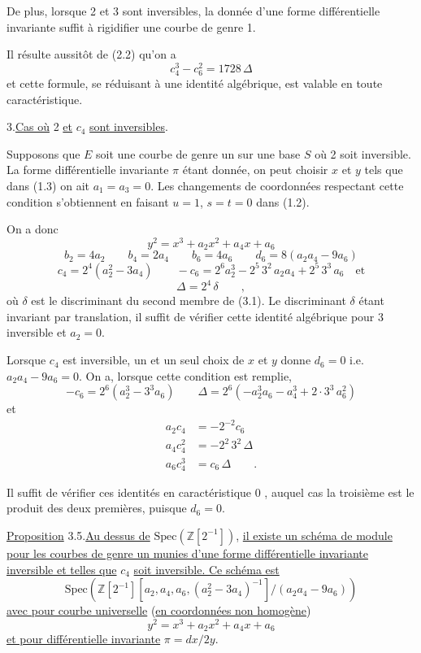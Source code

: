De plus, lorsque 2 et 3 sont inversibles, la donnée d'une forme différentielle invariante suffit à rigidifier une courbe de genre 1.

Il résulte aussitôt de (2.2) qu'on a
\[
c_4^3-c_6^2=1728\,\Delta\tag*{(2.6)}
\]
et cette formule, se réduisant à une identité algébrique, est valable en toute caractéristique.

3.\qquad \uline{Cas où} 2 \uline{et} $c_4$ \uline{sont inversibles}.

Supposons que $E$ soit une courbe de genre un sur une base $S$ où 2 soit inversible. La forme différentielle invariante $\pi$ étant donnée, on peut choisir $x$ et $y$ tels que dans (1.3) on ait $a_1=a_3=0$. Les changements de coordonnées respectant cette condition s'obtiennent en faisant $u=1$, $s=t=0$ dans (1.2).

On a donc
\[
y^2=x^3+a_2x^2+a_4x+a_6\tag*{(3.1)}
\]
\[
b_2=4a_2\qquad b_4=2a_4\qquad b_6=4a_6\qquad d_6=8(a_2a_4-9a_6)
\]
\[
c_4=2^4(a_2^2-3a_4)\qquad -c_6=2^6a_2^3-2^5\,3^2\,a_2a_4+2^5\,3^3\,a_6\quad\text{et}\tag*{(3.2)}
\]
\[
\Delta=2^4\,\delta \qquad ,
\]
où $\delta$ est le discriminant du second membre de (3.1). Le discriminant $\delta$ étant invariant par translation, il suffit de vérifier cette identité algébrique pour 3 inversible et $a_2=0$.

Lorsque $c_4$ est inversible, un et un seul choix de $x$ et $y$ donne $d_6=0$  i.e. $a_2a_4-9a_6=0$. On a, lorsque cette condition est remplie,
\[
-c_6=2^6(a_2^3-3^3a_6)\qquad \Delta=2^6(-a_2^3a_6-a_4^3+2\cdot3^3\,a_6^2)\tag*{(3.3)}
\]
et
\[
\begin{aligned}
a_2c_4&=-2^{-2}c_6\\
a_4c_4^2&=-2^2\,3^2\,\Delta\\
a_6c_4^3&=c_6\,\Delta\qquad .
\end{aligned}\tag*{(3.4)}
\]

Il suffit de vérifier ces identités en caractéristique 0 , auquel cas la troisième est le produit des deux premières, puisque $d_6=0$.

\uline{Proposition} 3.5.\qquad \uline{Au dessus de} $\mathrm{Spec}(\mathbb Z[2^{-1}])$, \uline{il existe un schéma de module pour les courbes de genre un munies d'une forme différentielle invariante inversible et telles que} $c_4$ \uline{soit inversible. Ce schéma est}
\[
\mathrm{Spec}(\mathbb Z[2^{-1}][a_2,a_4,a_6,(a_2^2-3a_4)^{-1}]/(a_2a_4-9a_6))
\]
\uline{avec pour courbe universelle} (\uline{en coordonnées non homogène}) 
\[
y^2=x^3+a_2x^2+a_4x+a_6
\]
\uline{et pour différentielle invariante} $\pi=dx/2y$.

